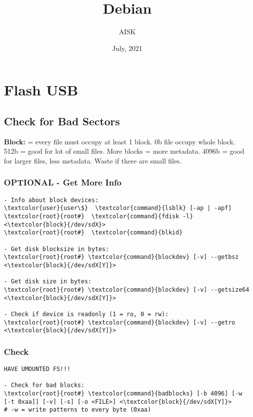 \documentclass[10pt, a4paper, onecolumn, openany]{book} %
\title{\textbf{Debian}}
\author{AISK}
\date{July, 2021}
\begin{document}
\maketitle
\tableofcontents

\chapter{Flash USB}%

\section{Check for Bad Sectors}
\textbf{Block:} = every file must occupy at least 1 block. 0b file occupy whole block.\newline
512b = good for lot of small files. More blocks = more metadata.\newline
4096b =  good for larger files, less metadata. Waste if there are small files.
\subsection{OPTIONAL - Get More Info}
\begin{Verbatim}[commandchars=\\\{\}]
- Info about block devices:
\textcolor{user}{user\$}  \textcolor{command}{lsblk} [-ap | -apf]
\textcolor{root}{root#}  \textcolor{command}{fdisk -l} <\textcolor{block}{/dev/sdX}>
\textcolor{root}{root#}  \textcolor{command}{blkid}

- Get disk blocksize in bytes:
\textcolor{root}{root#} \textcolor{command}{blockdev} [-v] --getbsz <\textcolor{block}{/dev/sdX[Y]}>

- Get disk size in bytes:
\textcolor{root}{root#} \textcolor{command}{blockdev} [-v] --getsize64 <\textcolor{block}{/dev/sdX[Y]}>

- Check if device is readonly (1 = ro, 0 = rw):
\textcolor{root}{root#} \textcolor{command}{blockdev} [-v] --getro <\textcolor{block}{/dev/sdX[Y]}>
\end{Verbatim}

\subsection{Check}
\begin{Verbatim}[commandchars=\\\{\}]
HAVE UMOUNTED FS!!!

- Check for bad blocks:
\textcolor{root}{root#} \textcolor{command}{badblocks} [-b 4096] [-w [-t 0xaa]] [-v] [-s] [-o <FILE>] <\textcolor{block}{/dev/sdX[Y]}>
# -w = write patterns to every byte (0xaa)
\end{Verbatim}
\end{document}
